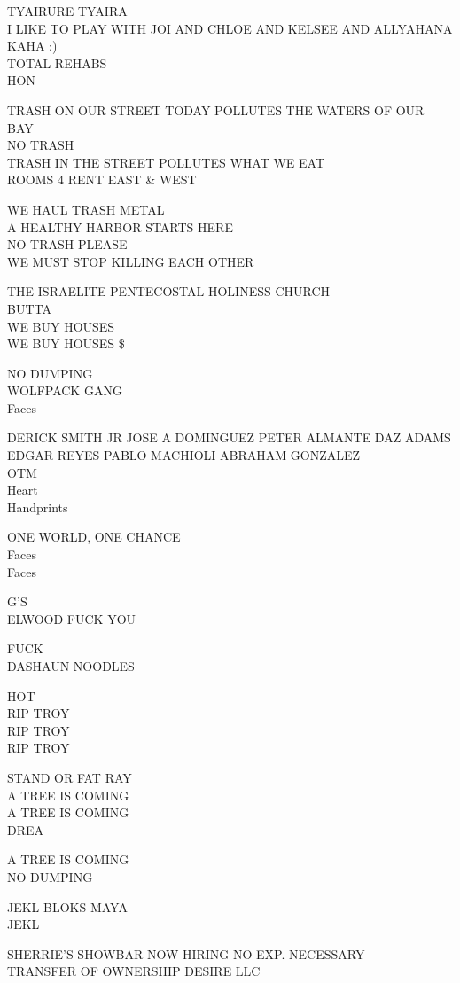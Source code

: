 \documentclass[10pt,letterpaper]{article}
\begin{document}
TYAIRURE TYAIRA\\
I LIKE TO PLAY WITH JOI AND CHLOE AND KELSEE AND ALLYAHANA KAHA :)\\
TOTAL REHABS\\
HON

TRASH ON OUR STREET TODAY POLLUTES THE WATERS OF OUR BAY\\
NO TRASH\\
TRASH IN THE STREET POLLUTES WHAT WE EAT\\
ROOMS 4 RENT EAST \& WEST

WE HAUL TRASH METAL\\
A HEALTHY HARBOR STARTS HERE\\
NO TRASH PLEASE\\
WE MUST STOP KILLING EACH OTHER

THE ISRAELITE PENTECOSTAL HOLINESS CHURCH\\
BUTTA\\
WE BUY HOUSES\\
WE BUY HOUSES \$

NO DUMPING\\
WOLFPACK GANG\\
Faces

DERICK SMITH JR JOSE A DOMINGUEZ PETER ALMANTE DAZ ADAMS EDGAR REYES PABLO MACHIOLI ABRAHAM GONZALEZ\\
OTM\\
Heart\\
Handprints

ONE WORLD, ONE CHANCE\\
Faces\\
Faces

G'S\\
ELWOOD FUCK YOU

FUCK\\
DASHAUN NOODLES

HOT\\
RIP TROY\\
RIP TROY\\
RIP TROY

STAND OR FAT RAY\\
A TREE IS COMING\\
A TREE IS COMING\\
DREA

A TREE IS COMING\\
NO DUMPING

JEKL BLOKS MAYA\\
JEKL

SHERRIE'S SHOWBAR NOW HIRING NO EXP. NECESSARY\\
TRANSFER OF OWNERSHIP DESIRE LLC
\end{document}
